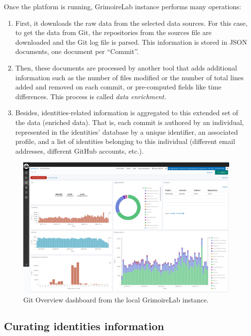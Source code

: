 \documentclass[a4paper, 12pt]{book}
\begin{document}
Once the platform is running, GrimoireLab instance performs many operations:
\begin{enumerate}
    \item First, it downloads the raw data from the selected data sources. For this case, to get the data from Git, the repositories from the sources file are downloaded and the Git log file is parsed. This information is stored in JSON documents, one document per ``Commit''.
    \item Then, these documents are processed by another tool that adds additional information such as the number of files modified or the number of total lines added and removed on each commit, or pre-computed fields like time differences. This process is called \textit{data enrichment.}
    \item Besides, identities-related information is aggregated to this extended set of the data (enriched data). That is, each commit is authored by an individual, represented in the identities' database by a unique identifier, an associated profile, and a list of identities belonging to this individual (different email addresses, different GitHub accounts, etc.).
\end{enumerate}

\begin{figure}
 \centering
  \includegraphics[width=15cm, keepaspectratio]{img/local-instance-grimoirelab-1.png}
  \caption{Git Overview dashboard from the local GrimoireLab instance.}
  \label{fig:local-grimoirelab-git}
\end{figure}

\subsection{Curating identities information}
\label{ssec:curate-identities}
\end{document}
